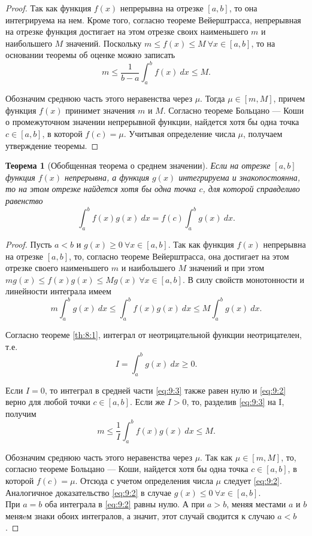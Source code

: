 \documentclass[12pt]{report}
\numberwithin{equation}{section}
\newtheorem{theorem}{Теорема}[section]
\begin{document}
\begin{proof}
Так как функция $f(x)$ непрерывна на отрезке $[a,b]$, то она интегрируема на нем. Кроме того, согласно теореме Вейерштрасса, непрерывная на отрезке функция достигает на этом отрезке своих наименьшего $m$ и наибольшего $M$ значений. Поскольку $m \leqslant f(x) \leqslant M~\forall x \in [a,b]$, то на основании теоремы об оценке можно записать 
\[ m \leqslant \frac{1}{b-a} \int_a^b f(x)~dx \leqslant M.\]

Обозначим среднюю часть этого неравенства через $\mu$. Тогда $\mu \in [m, M]$, причем функция $f(x)$ принимет значения $m$ и $M$.  Согласно теореме Больцано --- Коши о промежуточном значении непрерывной функции, найдется хотя бы одна точка $c \in [a,b]$, в которой $f(c) = \mu$. Учитывая определение числа $\mu$, получаем утверждение теоремы.
\end{proof}
\begin{theorem} [Обобщенная теорема о среднем значении]
Если на отрезке $[a,b]$ функция $f(x)$ непрерывна, а функция $g(x)$ интегрируема и знакопостоянна, то на этом отрезке найдется хотя бы одна точка $c$, для которой справделиво равенство
\begin{equation} \label{eq:9:2}
\int_a^b f(x) g(x)~dx = f(c) \int_a^b g(x)~dx.
\end{equation}
\end{theorem}
\begin{proof}
Пусть $a < b$ и $g(x) \geqslant 0~\forall x \in [a,b]$. Так как функция $f(x)$ непрерывна на отрезке $[a,b]$, то, согласно теореме Вейерштрасса, она достигает на этом отрезке своего наименьшего $m$ и наибольшего $M$ значений и при этом $m g(x) \leqslant f(x)g(x) \leqslant Mg(x)~\forall x \in [a,b]$. В силу свойств монотонности и линейности интеграла имеем
\begin{equation} \label{eq:9:3}
m \int_a^b g(x)~dx \leqslant \int_a^b f(x) g(x) ~dx \leqslant M \int_a^b g(x)~dx.
\end{equation}

Согласно теореме \ref{th:8:1}, интеграл от неотрицательной функции неотрицателен, т.е.
\[ I = \int_a^b g(x)~dx \geqslant 0.\]

Если $I = 0$, то интеграл в средней части \eqref{eq:9:3} также равен нулю и \eqref{eq:9:2} верно для любой точки $c \in [a,b]$. Если же $I > 0$, то, разделив \eqref{eq:9:3} на I, получим
\[ m \leqslant \frac{1}{I} \int_a^b f(x) g(x) ~dx \leqslant M.\]

Обозначим среднюю часть этого неравенства через $\mu$. Так как $\mu \in [m, M]$, то, согласно теореме Больцано --- Коши, найдется хотя бы одна точка $c \in [a,b]$, в которой  $f(c) = \mu$. Отсюда с учетом определения числа $\mu$ следует \eqref{eq:9:2}.\\

Аналогичное доказательство \eqref{eq:9:2} в случае $g(x) \leqslant 0~\forall x \in [a,b]$.\\

При $a = b$ оба интеграла в \eqref{eq:9:2} равны нулю. А при $a > b$, меняя местами $a$ и $b$ меняeм знаки обоих интегралов, а значит, этот случай сводится к случаю $a < b$.
\end{proof}
\end{document}
